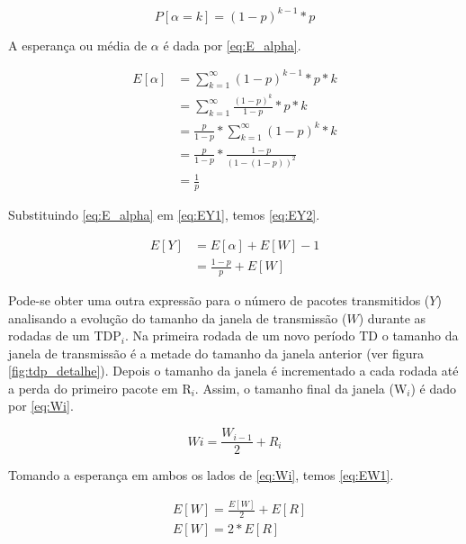 \begin{equation} \label{eq:P_alpha}
P[\alpha=k]=(1 - p)^{k - 1} * p
\end{equation}

A esperança ou média de $\alpha$ é dada por \eqref{eq:E_alpha}.

\begin{align} \label{eq:E_alpha}
\nonumber E[\alpha] &= \sum_{k=1}^\infty (1 - p)^{k - 1} * p * k \\
\nonumber &= \sum_{k=1}^\infty \frac{(1 - p)^{k}}{1 - p} * p * k\\ 
\nonumber &= \frac{p}{1 - p} * \sum_{k=1}^\infty (1 - p)^k * k \\ 
\nonumber &= \frac{p}{1 - p} * \frac{1 - p}{(1 - (1 - p))^2} \\
&= \frac{1}{p}
\end{align}

Substituindo \eqref{eq:E_alpha} em \eqref{eq:EY1}, temos \eqref{eq:EY2}. 

\begin{align} \label{eq:EY2}
\nonumber E[Y] &= E[\alpha] + E[W] - 1 \\
&= \frac{1 - p}{p} + E[W]
\end{align}

Pode-se obter uma outra expressão para o número de pacotes transmitidos ($Y$) analisando
a evolução do tamanho da janela de transmissão ($W$) durante as rodadas de um TDP$_i$.
Na primeira rodada de um novo período TD o tamanho da janela de transmissão é a metade
do tamanho da janela anterior (ver figura \ref{fig:tdp_detalhe}). Depois o tamanho da janela
é incrementado a cada rodada até a perda do primeiro pacote em R{$_i$}. Assim, o tamanho 
final da janela (W$_i$) é dado por \eqref{eq:Wi}.

\begin{equation} \label{eq:Wi}
Wi=\frac{W_{i-1}}{2} + R_i
\end{equation}

Tomando a esperança em ambos os lados de \eqref{eq:Wi}, temos \eqref{eq:EW1}.

\begin{align} \label{eq:EW1}
\nonumber & E[W]=\frac{E[W]}{2} + E[R] \\
& E[W]= 2 * E[R]
\end{align}
